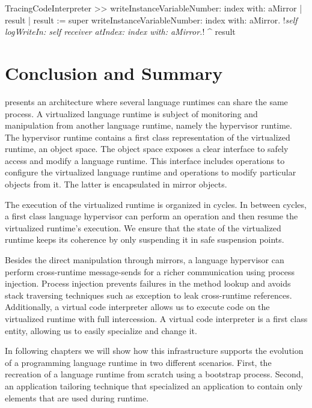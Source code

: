 \begin{code}
TracingCodeInterpreter >> writeInstanceVariableNumber: index with: aMirror
    | result |
    result := super writeInstanceVariableNumber: index with: aMirror.
    !\emph{self logWriteIn: self receiver atIndex: index with: aMirror.}!
    ^ result
\end{code}

\section{Conclusion and Summary}

\Vtt presents an architecture where several language runtimes can share the same process. A virtualized language runtime is subject of monitoring and manipulation from another language runtime, namely the hypervisor runtime. The hypervisor runtime contains a first class representation of the virtualized runtime, an object space. The object space exposes a clear interface to safely access and modify a language runtime. This interface includes operations to configure the virtualized language runtime and operations to modify particular objects from it. The latter is encapsulated in mirror objects.

The execution of the virtualized runtime is organized in cycles. In between cycles, a first class language hypervisor can perform an operation and then resume the virtualized runtime's execution. We ensure that the state of the virtualized runtime keeps its coherence by only suspending it in safe suspension points.

Besides the direct manipulation through mirrors, a language hypervisor can perform cross-runtime message-sends for a richer communication using process injection. Process injection prevents failures in the method lookup and avoids stack traversing techniques such as exception to leak cross-runtime references. Additionally, a virtual code interpreter allows us to execute code on the virtualized runtime with full intercession. A virtual code interpreter is a first class entity, allowing us to easily specialize and change it.

In following chapters we will show how this infrastructure supports the evolution of a programming language runtime in two different scenarios. First, the recreation of a language runtime from scratch using a bootstrap process. Second, an application tailoring technique that specialized an application to contain only elements that are used during runtime.

